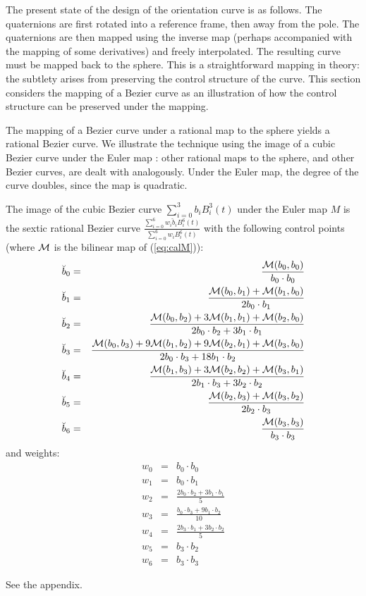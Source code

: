 \documentclass[12pt]{article}
\begin{document}
The present state of the design of the orientation curve is as follows.
The quaternions are first rotated into a reference frame, then away from the pole.
The quaternions are then mapped using the inverse map 
(perhaps accompanied with the mapping of some derivatives)
and freely interpolated.
The resulting curve must be mapped back to the sphere.
This is a straightforward mapping in theory: the subtlety arises from
preserving the control structure of the curve.
This section considers the mapping of a Bezier curve as an illustration
of how the control structure can be preserved under the mapping.

The mapping of a Bezier curve under a rational map to the sphere
yields a rational Bezier curve.
We illustrate the technique using the image of a cubic Bezier curve 
under the Euler map : other rational maps to the sphere, and other Bezier curves,
are dealt with analogously.
Under the Euler map, the degree of the curve doubles, since the map is quadratic.

\begin{theorem}
\label{thm:imagecurve}
The image of the cubic Bezier curve $\sum_{i=0}^3 b_i B_i^3(t)$ under the Euler map $M$ 
is the sextic rational Bezier curve $\frac{\sum_{i=0}^6 w_i \breve{b}_i B_i^6(t)}
                                          {\sum_{i=0}^6 w_i B_i^6(t)}$ 
with the following control points (where ${\cal M}$ is the bilinear map 
of (\ref{eq:calM})):
\begin{eqnarray}
\breve{b}_0 & = & \frac{{\cal M}(b_0,b_0)}{b_0 \cdot b_0} \nonumber \\
\breve{b}_1 & = & \frac{{\cal M}(b_0,b_1) + {\cal M}(b_1,b_0)}{2b_0\cdot b_1} \nonumber \\
\breve{b}_2 & = & \frac{{\cal M}(b_0,b_2) + 3{\cal M}(b_1,b_1) + {\cal M}(b_2,b_0)}{2b_0 \cdot b_2 + 3b_1 \cdot b_1} \nonumber \\
\breve{b}_3 & = & \frac{{\cal M}(b_0,b_3) + 9{\cal M}(b_1,b_2) + 9{\cal M}(b_2,b_1) + {\cal M}(b_3,b_0)}{2b_0 \cdot b_3 + 18 b_1 \cdot b_2} \nonumber \\
\breve{b}_4 & = & \frac{{\cal M}(b_1,b_3) + 3{\cal M}(b_2,b_2) + {\cal M}(b_3,b_1)}{2b_1 \cdot b_3 + 3 b_2 \cdot b_2} \nonumber \\
\breve{b}_5 & = & \frac{{\cal M}(b_2,b_3) + {\cal M}(b_3,b_2)}{2b_2 \cdot b_3} \nonumber \\
\breve{b}_6 & = & \frac{{\cal M}(b_3,b_3)}{b_3 \cdot b_3} \nonumber
\end{eqnarray}
and weights:
\begin{eqnarray}
w_0 & = & b_0 \cdot b_0 \nonumber \\
w_1 & = & b_0 \cdot b_1 \nonumber \\
w_2 & = & \frac{2b_0 \cdot b_2 + 3b_1 \cdot b_1}{5} \nonumber \\
w_3 & = & \frac{b_0 \cdot b_3 + 9b_1 \cdot b_2}{10} \nonumber \\
w_4 & = & \frac{2b_3 \cdot b_1 + 3b_2 \cdot b_2}{5} \nonumber \\
w_5 & = & b_3 \cdot b_2 \nonumber \\
w_6 & = & b_3 \cdot b_3 \nonumber
\end{eqnarray}
\end{theorem}
\prf See the appendix.
\QED
\end{document}
